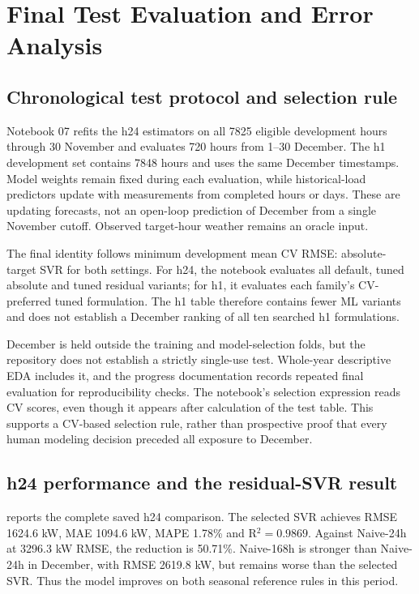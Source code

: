 \section{Final Test Evaluation and Error Analysis}\label{sec:final}
\subsection{Chronological test protocol and selection rule}
Notebook 07 refits the h24 estimators on all \num{7825} eligible development hours through 30 November and evaluates 720 hours from 1--30 December. The h1 development set contains \num{7848} hours and uses the same December timestamps. Model weights remain fixed during each evaluation, while historical-load predictors update with measurements from completed hours or days. These are updating forecasts, not an open-loop prediction of December from a single November cutoff. Observed target-hour weather remains an oracle input.

The final identity follows minimum development mean CV RMSE: absolute-target SVR for both settings. For h24, the notebook evaluates all default, tuned absolute and tuned residual variants; for h1, it evaluates each family's CV-preferred tuned formulation. The h1 table therefore contains fewer ML variants and does not establish a December ranking of all ten searched h1 formulations.

December is held outside the training and model-selection folds, but the repository does not establish a strictly single-use test. Whole-year descriptive EDA includes it, and the progress documentation records repeated final evaluation for reproducibility checks. The notebook's selection expression reads CV scores, even though it appears after calculation of the test table. This supports a CV-based selection rule, rather than prospective proof that every human modeling decision preceded all exposure to December.

\subsection{h24 performance and the residual-SVR result}
 reports the complete saved h24 comparison. The selected SVR achieves RMSE \num{1624.6} kW, MAE \num{1094.6} kW, MAPE \num{1.78}\% and R$^2=\num{0.9869}$. Against Naive-24h at \num{3296.3} kW RMSE, the reduction is \num{50.71}\%. Naive-168h is stronger than Naive-24h in December, with RMSE \num{2619.8} kW, but remains worse than the selected SVR. Thus the model improves on both seasonal reference rules in this period.



